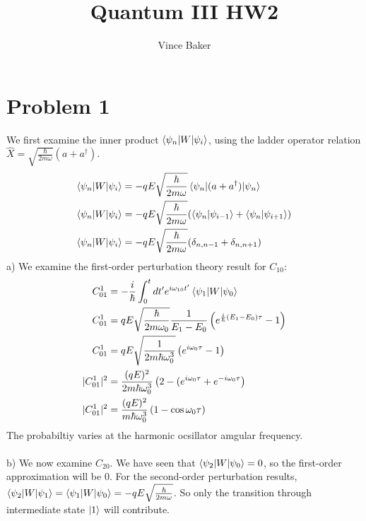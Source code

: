 \documentclass[a4paper,11pt]{article}
\title{Quantum III HW2}
\author{Vince Baker}
\numberwithin{equation}{section}
\begin{document}
\maketitle

\section{Problem 1}
We first examine the inner product $\braket{\psi_n|W|\psi_i}$, using the ladder operator relation $\hat{X}=\sqrt{\frac{\hbar}{2m\omega}}(a+a^\dagger)$.
\begin{align}
 \braket{\psi_n|W|\psi_i} &= -qE\sqrt{\frac{\hbar}{2m\omega}}\braket{\psi_n|(a+a^\dagger)|\psi_n}\\
 \braket{\psi_n|W|\psi_i} &= -qE\sqrt{\frac{\hbar}{2m\omega}}(\braket{\psi_n|\psi_{i-1}}+\braket{\psi_n|\psi_{i+1}} )\\
 \braket{\psi_n|W|\psi_i} &= -qE\sqrt{\frac{\hbar}{2m\omega}}(\delta_{n,n-1}+\delta_{n,n+1})
\end{align}
a) We examine the first-order perturbation theory result for $C_{10}$:
\begin{align}
 C_{01}^1 &= -\frac{i}{\hbar}\int_0^t dt^\prime e^{i\omega_{10}t^\prime}\braket{\psi_1|W|\psi_0}\\
 C_{01}^1 &= qE\sqrt{\frac{\hbar}{2m\omega_0}}\frac{1}{E_1-E_0}\left(e^{\frac{i}{\hbar}(E_1-E_0)\tau}-1 \right)\\
 C_{01}^1 &= qE\sqrt{\frac{1}{2m\hbar\omega_0^3}}\left(e^{i\omega_0\tau}-1 \right)\\
 |C_{01}^1|^2 &= \frac{(qE)^2}{2m\hbar\omega_0^3} \left(2-(e^{i\omega_0\tau}+e^{-i\omega_0\tau} \right)\\
 |C_{01}^1|^2 &= \frac{(qE)^2}{m\hbar\omega_0^3}\left(1-\cos{\omega_0\tau} \right)
\end{align}
The probabiltiy varies at the harmonic ocsillator amgular frequency.\\
\\
b) We now examine $C_{20}$. We have seen that $\braket{\psi_2|W|\psi_0}=0$, so the first-order approximation will be 0.
For the second-order perturbation results, $\braket{\psi_2|W|\psi_1}=\braket{\psi_1|W|\psi_0}=-qE\sqrt{\frac{\hbar}{2m\omega}}$.
So only the transition through intermediate state $\ket{1}$ will contribute.
\end{document}
